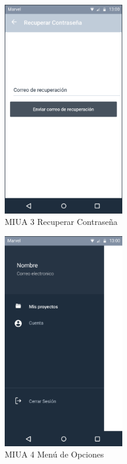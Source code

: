 \newpage
\begin{figure}[h]
	\centering
	\includegraphics[width=200px]{capitulo4/imagenes/android/MIUA_3.png}
	\caption{MIUA 3 Recuperar Contraseña}
	\label{fig:MIUA-3} %
\end{figure}
\newpage
\begin{figure}[h]
	\centering
	\includegraphics[width=200px]{capitulo4/imagenes/android/MIUA_4.png}
	\caption{MIUA 4 Menú de Opciones}
	\label{fig:MIUA-4} %
\end{figure}
\newpage
